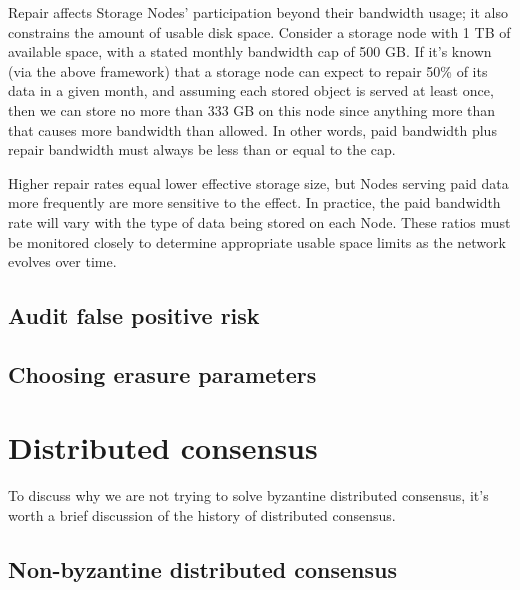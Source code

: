 \documentclass[8pt,fleqn,openany]{book}
\begin{document}
Repair affects Storage Nodes' participation beyond their bandwidth usage; it
also constrains the amount of usable disk space.
Consider a storage node with 1 TB of available space, with a stated monthly
bandwidth cap of 500 GB.
If it's known (via the above framework) that a storage node can expect to
repair 50\% of its data in a given month, and assuming each stored object
is served at least once, then we can store no more than 333 GB on this node
since anything more than that causes more bandwidth than allowed.
In other words, paid bandwidth plus repair bandwidth must always be less than
or equal to the cap.

Higher repair rates equal lower effective storage size, but Nodes serving paid
data more frequently are more sensitive to the effect.
In practice, the paid bandwidth rate will vary with the type of data being
stored on each Node.
These ratios must be monitored closely to determine appropriate usable space
limits as the network evolves over time.

\pagebreak
\section{Audit false positive risk}\label{sec:audit-false-positive}



\pagebreak
\section{Choosing erasure parameters}
\label{sec:RS}





\newpage \appendix
{}

\chapter{Distributed consensus}\label{chap:dist-consensus}

To discuss why we are not trying to solve byzantine distributed consensus,
it's worth a brief discussion of the history of distributed consensus.

\section{Non-byzantine distributed consensus}
\end{document}
